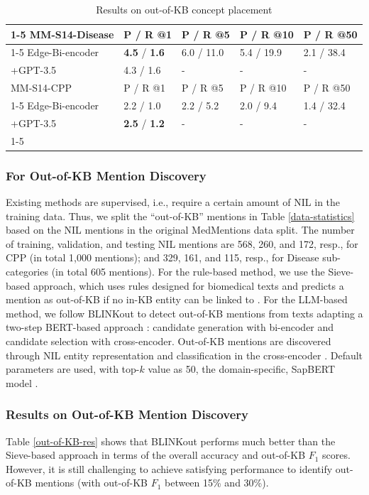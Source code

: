 \documentclass[sigconf]{acmart}
\begin{document}
\begin{table}
\small
\caption{Results on out-of-KB concept placement}\label{insertion-res}
\begin{tabular}{l|l|l|l|l}
\cline{1-5}
MM-S14-Disease  & P / R @1 & P / R @5 & P / R @10 & P / R @50\\
\cline{1-5}
Edge-Bi-encoder &  \textbf{4.5} / \textbf{1.6}         & 6.0 / 11.0         & 5.4 / 19.9 & 2.1 / 38.4  \\
+GPT-3.5    & 4.3 / 1.6          &    -       &   -      &  -  \\
\hline\hline
MM-S14-CPP      & P / R @1 & P / R @5 & P / R @10 & P / R @50 \\
\cline{1-5}
Edge-Bi-encoder &  2.2 / 1.0 & 2.2 / 5.2 & 2.0 / 9.4 & 1.4 / 32.4\\
+GPT-3.5        & \textbf{2.5} / \textbf{1.2}          &   -        &   -   &   -   \\
\cline{1-5}
\end{tabular}
\end{table}

\subsubsection*{For Out-of-KB Mention Discovery} Existing methods are supervised, i.e., require a certain amount of NIL in the training data. Thus, we split the ``out-of-KB'' mentions in Table \ref{data-statistics} based on the NIL mentions in the original MedMentions data split. The number of training, validation, and testing NIL mentions are 568, 260, and 172, resp., for CPP (in total 1,000 mentions); and 329, 161, and 115, resp., for Disease sub-categories  (in total 605 mentions). For the rule-based method, we use the Sieve-based approach, which uses rules designed for biomedical texts and predicts a mention as out-of-KB if no in-KB entity can be linked to \cite{dsouza-ng-2015-sieve-based}. For the LLM-based method, we follow BLINKout \cite{dong2023NIL} to detect out-of-KB mentions from texts adapting a two-step BERT-based approach \cite{wu2020blink}: candidate generation with bi-encoder and candidate selection with cross-encoder. Out-of-KB mentions are discovered through NIL entity representation and classification in the cross-encoder \cite{dong2023NIL}. Default parameters are used, with top-$k$ value as 50, the domain-specific, SapBERT model \cite{liu2021sap}.

\subsubsection*{Results on Out-of-KB Mention Discovery} Table \ref{out-of-KB-res} shows that BLINKout performs much better than the Sieve-based approach in terms of the overall accuracy and out-of-KB $F_1$ scores. However, it is still challenging to achieve satisfying performance to identify out-of-KB mentions (with out-of-KB $F_{1}$ between 15\% and 30\%).
\end{document}
